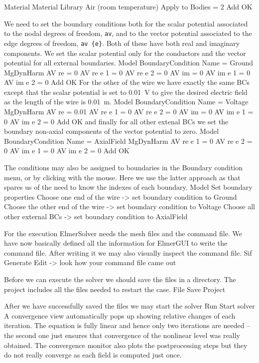   Material
    Material Library
      Air (room temperature)
    Apply to Bodies = 2
    Add
    OK
\ttend

We need to set the boundary conditions both for the scalar potential associated to the nodal degrees of freedom, \texttt{av},
and to the vector potential associated to the edge degrees of freedom, \texttt{av \{e\}}.
Both of these have both real and imaginary components. 
We set the scalar potential only for the conductors and the vector potential for all external boundaries.
\ttbegin
Model
  BoundaryCondition
    Name = Ground 
    MgDynHarm
      AV re = 0
      AV re {e} 1 = 0
      AV re {e} 2 = 0
      AV im = 0
      AV im {e} 1 = 0
      AV im {e} 2 = 0
    Add
    OK
\ttend   
For the other of the wire we have exactly the same BCs except that the scalar potential is set to 0.01~V to give the desired
electric field as the length of the wire is 0.01~m. 
\ttbegin
Model
  BoundaryCondition
    Name = Voltage
    MgDynHarm
      AV re = 0.01
      AV re {e} 1 = 0
      AV re {e} 2 = 0
      AV im = 0
      AV im {e} 1 = 0
      AV im {e} 2 = 0
    Add
    OK
\ttend   
and finally for all other extenal BCs we set the boundary non-axial components of the vector potential to zero.
\ttbegin
Model
  BoundaryCondition
    Name = AxialField
    MgDynHarm
      AV re {e} 1 = 0
      AV re {e} 2 = 0
      AV im {e} 1 = 0
      AV im {e} 2 = 0
    Add
    OK
\ttend 


The conditions may also be assigned to boundaries in the Boundary condition menu, or 
by clicking with the mouse. Here we use the latter approach as that spares us of the 
need to know the indexes of each boundary.
\ttbegin
Model
  Set boundary properties
    Choose one end of the wire -> set boundary condition to Ground
    Choose the other end of the wire -> set boundary condition to Voltage
    Choose all other external BCs -> set boundary condition to AxialField
\ttend

For the execution 
ElmerSolver needs the mesh files and the command file. We have now basically defined
all the information for ElmerGUI to write the command file. After writing it we may also visually 
inspect the command file.
\ttbegin
Sif 
  Generate
  Edit -> look how your command file came out  
\ttend

Before we can execute the solver we should save the files in a directory. The project includes
all the files needed to restart the case.
\ttbegin
File 
  Save Project
\ttend

After we have successfully saved the files we may start the solver
\ttbegin
Run
  Start solver
\ttend
A convergence view automatically pops up showing relative changes of each iteration.
The equation is fully linear and hence only two iterations are needed -- the second 
one just ensures that convergence of the nonlinear level was really obtained. 
The convergence monitor also plots the postprocessing steps but they do not really converge as each field is computed just once. 


